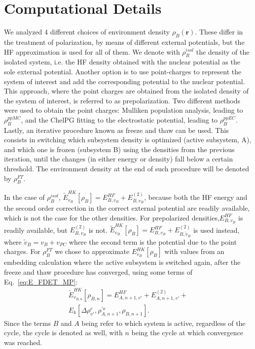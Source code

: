 \documentclass[journal=jctcce,manuscript=article, layout=twocolumn]{achemso}
\begin{document}
 \section{Computational Details} \label{sect:comp_det}
 We analyzed 4 different choices of environment density $\rho_B(\mathbf{r})$. These differ in the treatment of polarization, by means of different external potentials, but the HF approximation is used for all of them.
 We denote with $\rho_B^{isol}$ the density of the isolated system, i.e. the HF density obtained with the nuclear potential as the sole external potential.
 Another option is to use point-charges to represent the system of interest and add the corresponding potential to the nuclear potential. This approach, where the point charges are obtained from the isolated density of the system of interest, is referred to as prepolarization. Two different methods were used to obtain the point charges: Mulliken population analysis, leading to $\rho_B^{ppMC}$, and the ChelPG fitting to the electrostatic potential, leading to $\rho_B^{ppEC}$. 
 Lastly, an iterative procedure known as freeze and thaw can be used. This consists in switching which subsystem density is optimized (active subsystem, A), and which one is frozen (subsystem B) using the densities from the previous iteration, until the changes (in either energy or density) fall below a certain threshold. The environment density at the end of such procedure will be denoted by $\rho_B^{FT}$.
 
 In the case of $\rho_B^{isol}$, $\tilde{E}^{HK}_{v_B}[\rho_B] = E^{HF}_{B,v_B} + E^{(2)}_{B,v_B}$, because both the HF energy and the second order correction in the correct external potential are readily available, which is not the case for the other densities. For prepolarized densities,$E^{HF}_{B,v_B}$ is readily available, but $E^{(2)}_{B,v_B}$ is not. $\tilde{E}^{HK}_{v_B}[\rho_B] = E^{HF}_{B,v_B} + E^{(2)}_{B,\tilde{v}_B}$ is used instead, where $\tilde{v}_B = v_B + v_{PC}$ where the second term is the potential due to the point charges.
 For $\rho_B^{FT}$ we chose to approximate $E^{HK}_{v_B}[\rho_B]$ with values from an embedding calculation where the active subsystem is switched again, after the freeze and thaw procedure has converged, using some terms of Eq.~\ref{eq:E_FDET_MP}:
\begin{align} \label{eq:HK_B_FT}
 \tilde{E}^{HK}_{v_{B,n}}[\rho_{B,n}] = E^{HF}_{A,n+1,v'} + E^{(2)}_{A,n+1,v'} + \\ \nonumber
 E_k[\Delta \rho^c_{v'}, \rho^{'o}_{A,n+1}, \rho_{B,n+1}].
\end{align}
Since the terms $B$ and $A$ being refer to which system is active, regardless of the cycle, the cycle is denoted as well, with $n$ being the cycle at which convergence was reached.
\end{document}

